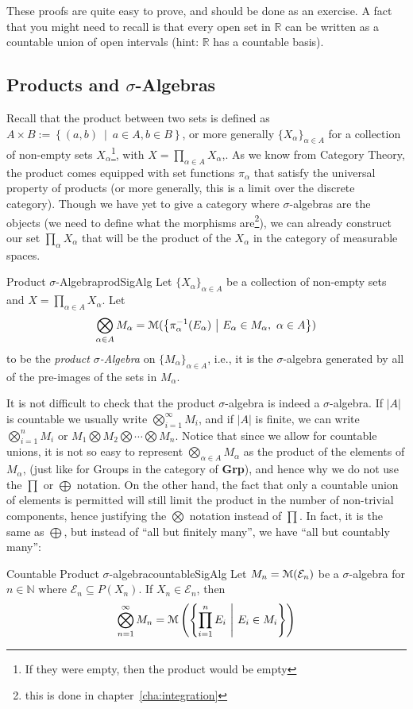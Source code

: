 \documentclass[oneside]{book}
\newcommand{\N}{\mathbb{N}}
\newcommand{\R}{\mathbb{R}}
\newcommand{\CE}{\mathcal{E}}
\newcommand{\MM}{\EuScript{M}}
\newcommand{\sse}{\subseteq}
\newcommand{\set}[2]{\left\{#1 \ \middle|\ #2\right\}}
\renewcommand{\bf}[1]{\textbf{#1}}
\begin{document}
\begin{Proof}
	These proofs are quite easy to prove, and should be done as an exercise. A fact that you might need to recall is
	that every open set in $\R$ can be written as a countable union of open intervals (hint: $\R$ has a countable basis). 
\end{Proof}

\subsection*{Products and $\sigma$-Algebras}

Recall that the product between two sets is defined as $A\times B := \set{(a,b)}{a \in A, b \in B}$, or more generally
$\{X_\alpha\}_{\alpha \in A}$ for a collection of non-empty sets $X_\alpha$\footnote{If they were empty, then the
product would be empty}, with $X = \prod_{\alpha \in A} X_\alpha$,. As we
know from Category Theory, the product comes equipped with set functions $\pi_\alpha$ that satisfy the universal property of
products (or more generally, this is a limit over the discrete category). Though we have yet to give a category where
$\sigma$-algebras are the objects (we need to define what the morphisms are\footnote{this is done in chapter~\ref{cha:integration}}), we can already construct our set $\prod_\alpha X_\alpha$ that will
be the product of the $X_\alpha$ in the category of measurable spaces.

\begin{defn}{Product $\sigma$-Algebra}{prodSigAlg}
	Let $\{X_\alpha\}_{\alpha \in A}$ be a collection of non-empty sets and $X = \prod_{\alpha \in A} X_\alpha$. Let
	\[
		\bigotimes_{\alpha \in A} M_\alpha = \MM(\set{\pi_\alpha^{-1}(E_\alpha)}{E_\alpha \in M_\alpha,\ \alpha \in A})
	\]
	to be the \emph{product $\sigma$-Algebra} on $\{M_\alpha\}_{\alpha \in A}$, i.e., it is the $\sigma$-algebra
	generated by all of the pre-images of the sets in $M_\alpha$. 
\end{defn}

It is not difficult to check that the product $\sigma$-algebra is indeed a $\sigma$-algebra. If $|A|$ is countable we usually write $\bigotimes_{i=1}^\infty M_i$, and if $|A|$ is finite, we can write
$\bigotimes_{i=1}^n M_i$ or $M_1\bigotimes M_2 \bigotimes\cdots\bigotimes M_n$. Notice that since we allow for countable
unions, it is not so easy to represent $\bigotimes_{\alpha \in A} M_\alpha$ as the product of the elements of
$M_\alpha$, (just like for Groups in the category of \bf{Grp}), and hence why we do not use the $\prod$ or $\bigoplus$ notation.
On the other hand, the fact that only a countable union of elements is permitted will still limit the product in the number of non-trivial
components, hence justifying the $\bigotimes$ notation instead of $\prod$. In fact, it is the same as $\bigoplus$, but
instead of ``all but finitely many'', we have ``all but countably many'':
\begin{prop}{Countable Product $\sigma$-algebra}{countableSigAlg}
	Let $M_n = \MM(\CE_n)$ be a $\sigma$-algebra for $n \in \N$ where $\CE_n \sse P(X_n)$. If $X_n \in \CE_n$, then
	\[
		\bigotimes_{n=1}^\infty M_n = \MM\left(\set{\prod_{i=1}^n E_i}{E_i \in M_i}\right)
	\]
\end{prop}
\end{document}
